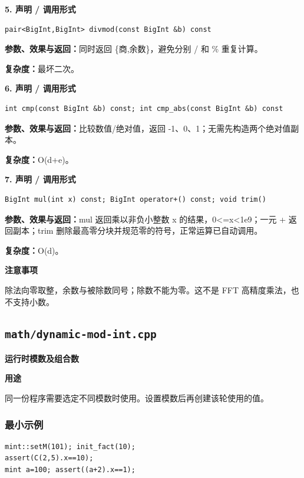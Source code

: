 \documentclass[UTF8,a4paper,10pt]{ctexart}
\newcommand{\TemplUsage}[1]{\textbf{用途}\par #1\par}
\newcommand{\TemplNote}[1]{\textbf{注意事项}\par #1\par}
\begin{document}
\noindent\begin{minipage}{\textwidth}
\textbf{5. 声明 / 调用形式}
\begin{lstlisting}
pair<BigInt,BigInt> divmod(const BigInt &b) const
\end{lstlisting}
\textbf{参数、效果与返回：}同时返回 \{商,余数\}，避免分别 / 和 \% 重复计算。

\textbf{复杂度：}最坏二次。

\end{minipage}\par\vspace{0.4em}
\noindent\begin{minipage}{\textwidth}
\textbf{6. 声明 / 调用形式}
\begin{lstlisting}
int cmp(const BigInt &b) const; int cmp_abs(const BigInt &b) const
\end{lstlisting}
\textbf{参数、效果与返回：}比较数值/绝对值，返回 -1、0、1；无需先构造两个绝对值副本。

\textbf{复杂度：}O(d+e)。

\end{minipage}\par\vspace{0.4em}
\noindent\begin{minipage}{\textwidth}
\textbf{7. 声明 / 调用形式}
\begin{lstlisting}
BigInt mul(int x) const; BigInt operator+() const; void trim()
\end{lstlisting}
\textbf{参数、效果与返回：}mul 返回乘以非负小整数 x 的结果，0<=x<1e9；一元 + 返回副本；trim 删除最高零分块并规范零的符号，正常运算已自动调用。

\textbf{复杂度：}O(d)。

\TemplNote{除法向零取整，余数与被除数同号；除数不能为零。这不是 FFT 高精度乘法，也不支持小数。}
\end{minipage}\par\vspace{0.4em}
\clearpage
\subsection{\texttt{math/dynamic-mod-int.cpp}}
\textbf{运行时模数及组合数}\par
\TemplUsage{同一份程序需要选定不同模数时使用。设置模数后再创建该轮使用的值。}
\subsubsection*{最小示例}
\begin{lstlisting}
mint::setM(101); init_fact(10);
assert(C(2,5).x==10);
mint a=100; assert((a+2).x==1);
\end{lstlisting}
\end{document}
